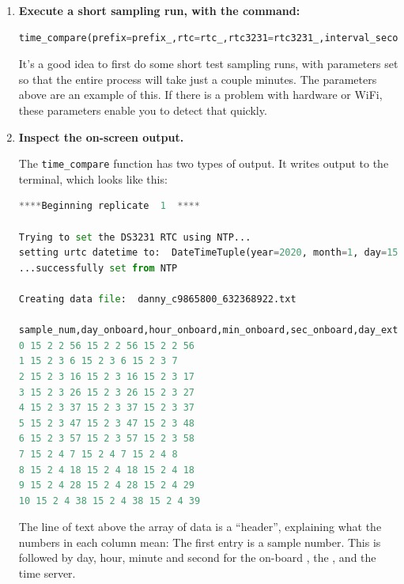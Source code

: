 \begin{enumerate}
\begin{itemize}
		\smallskip
		The total duration of sampling for each file will then be \lstinline{interval_sec} $\times$ \lstinline{n_samples} seconds. 
		Sampling for all the replicates will last \lstinline{interval_sec} $\times$ \lstinline{n_samples} $\times$ \lstinline{n_replicates} seconds.
	\end{itemize}
	\item \textbf{Execute a short sampling run, with the command:}
\begin{lstlisting}[language=Python]
time_compare(prefix=prefix_,rtc=rtc_,rtc3231=rtc3231_,interval_seconds=interval_sec,num_samples=n_samples,num_replicates=n_replicates)
\end{lstlisting}
	
	It's a good idea to first do some short test sampling runs, with parameters set so that the entire process will take just a couple minutes.
	The parameters above are an example of this. 
	If there is a problem with hardware or WiFi, these parameters enable you to detect that quickly.
	
	\item \textbf{Inspect the on-screen output.}
	
	The \lstinline{time_compare} function has two types of output. It writes output to the terminal, which looks like this:
\begin{lstlisting}[language=Python]
****Beginning replicate  1  ****

Trying to set the DS3231 RTC using NTP...
setting urtc datetime to:  DateTimeTuple(year=2020, month=1, day=15, weekday=None, hour=2, minute=2, second=56, millisecond=None)
...successfully set from NTP

Creating data file:  danny_c9865800_632368922.txt

sample_num,day_onboard,hour_onboard,min_onboard,sec_onboard,day_external,hour_external,min_external,sec_external,day_NTP,hour_NTP,min_NTP,sec_NTP
0 15 2 2 56 15 2 2 56 15 2 2 56 
1 15 2 3 6 15 2 3 6 15 2 3 7 
2 15 2 3 16 15 2 3 16 15 2 3 17 
3 15 2 3 26 15 2 3 26 15 2 3 27 
4 15 2 3 37 15 2 3 37 15 2 3 37 
5 15 2 3 47 15 2 3 47 15 2 3 48 
6 15 2 3 57 15 2 3 57 15 2 3 58 
7 15 2 4 7 15 2 4 7 15 2 4 8 
8 15 2 4 18 15 2 4 18 15 2 4 18 
9 15 2 4 28 15 2 4 28 15 2 4 29 
10 15 2 4 38 15 2 4 38 15 2 4 39 
\end{lstlisting}
	The line of text above the array of data is a ``header'', explaining what the numbers in each column mean: 
	The first entry is a sample number.
	This is followed by day, hour, minute and second for the on-board \rtc, the  \rtc, and the \ntp time server.
	

\end{enumerate}
